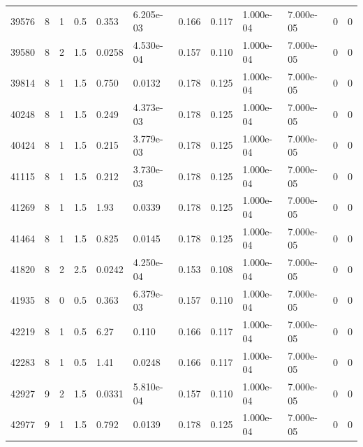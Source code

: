 \documentclass[preview]{standalone}
\begin{document}
{{{\begin{tabular}{L{1.2cm}C{1.2cm} C{0.3cm}C{0.5cm} C{1.4cm}C{1.4cm} C{1.4cm}C{1.4cm} C{1.6cm}C{1.6cm} C{1.6cm}C{1.6cm}}
  39576  &     8  & 1     & 0.5 &  0.353  & 6.205e-03  &  0.166&   0.117& 1.000e-04 & 7.000e-05   &  0 & 0  \\ 
  39580  &     8  & 2     & 1.5 &  0.0258  & 4.530e-04  &  0.157&   0.110& 1.000e-04 & 7.000e-05   &  0 & 0  \\ 
  39814  &     8  & 1     & 1.5 &  0.750  & 0.0132  &  0.178&   0.125& 1.000e-04 & 7.000e-05   &  0 & 0  \\ 
  40248  &     8  & 1     & 1.5 &  0.249  & 4.373e-03  &  0.178&   0.125& 1.000e-04 & 7.000e-05   &  0 & 0  \\ 
  40424  &     8  & 1     & 1.5 &  0.215  & 3.779e-03  &  0.178&   0.125& 1.000e-04 & 7.000e-05   &  0 & 0  \\ 
  41115  &     8  & 1     & 1.5 &  0.212  & 3.730e-03  &  0.178&   0.125& 1.000e-04 & 7.000e-05   &  0 & 0  \\ 
  41269  &     8  & 1     & 1.5 &  1.93  & 0.0339  &  0.178&   0.125& 1.000e-04 & 7.000e-05   &  0 & 0  \\ 
  41464  &     8  & 1     & 1.5 &  0.825  & 0.0145  &  0.178&   0.125& 1.000e-04 & 7.000e-05   &  0 & 0  \\ 
  41820  &     8  & 2     & 2.5 &  0.0242  & 4.250e-04  &  0.153&   0.108& 1.000e-04 & 7.000e-05   &  0 & 0  \\ 
  41935  &     8  & 0     & 0.5 &  0.363  & 6.379e-03  &  0.157&   0.110& 1.000e-04 & 7.000e-05   &  0 & 0  \\ 
  42219  &     8  & 1     & 0.5 &  6.27  & 0.110  &  0.166&   0.117& 1.000e-04 & 7.000e-05   &  0 & 0  \\ 
  42283  &     8  & 1     & 0.5 &  1.41  & 0.0248  &  0.166&   0.117& 1.000e-04 & 7.000e-05   &  0 & 0  \\ 
  42927  &     9  & 2     & 1.5 &  0.0331  & 5.810e-04  &  0.157&   0.110& 1.000e-04 & 7.000e-05   &  0 & 0  \\ 
  42977  &     9  & 1     & 1.5 &  0.792  & 0.0139  &  0.178&   0.125& 1.000e-04 & 7.000e-05   &  0 & 0  \\ 
\hline 
\end{tabular} 

}}}
\end{document}
